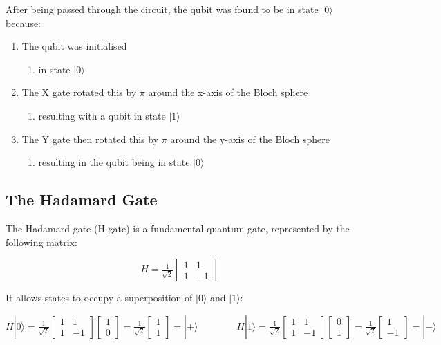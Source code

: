 After being passed through the circuit, the qubit was found to be in state $|0\rangle$ because:
\begin{enumerate}
    \item The qubit was initialised 
    \begin{enumerate}
        \item in state $|0\rangle$
    \end{enumerate}
    \item The X gate rotated this by $\pi$ around the x-axis of the Bloch sphere
    \begin{enumerate}
        \item resulting with a qubit in state $|1\rangle$
    \end{enumerate}
    \item The Y gate then rotated this by $\pi$ around the y-axis of the Bloch sphere
    \begin{enumerate}
        \item resulting in the qubit being in state $|0\rangle$
    \end{enumerate} 
\end{enumerate}

\subsection{The Hadamard Gate}\label{sec:HZH}
The Hadamard gate (H gate) is a fundamental quantum gate, represented by the following matrix:

$$ H = \tfrac{1}{\sqrt{2}}\begin{bmatrix} 1 & 1 \\ 1 & -1 \end{bmatrix} $$

It allows states to occupy a superposition of $|0\rangle$ and $|1\rangle$:

$$ H|0\rangle = \tfrac{1}{\sqrt{2}}\begin{bmatrix} 1 & 1 \\ 1 & -1 \end{bmatrix}\begin{bmatrix} 1 \\ 0 \end{bmatrix} = \tfrac{1}{\sqrt{2}} \begin{bmatrix} 1 \\ 1 \end{bmatrix}= |+\rangle 
\quad \quad \quad \quad 
H|1\rangle = \tfrac{1}{\sqrt{2}}\begin{bmatrix} 1 & 1 \\ 1 & -1 \end{bmatrix}\begin{bmatrix} 0 \\ 1 \end{bmatrix} = \tfrac{1}{\sqrt{2}} \begin{bmatrix} 1 \\ -1 \end{bmatrix}= |-\rangle $$

